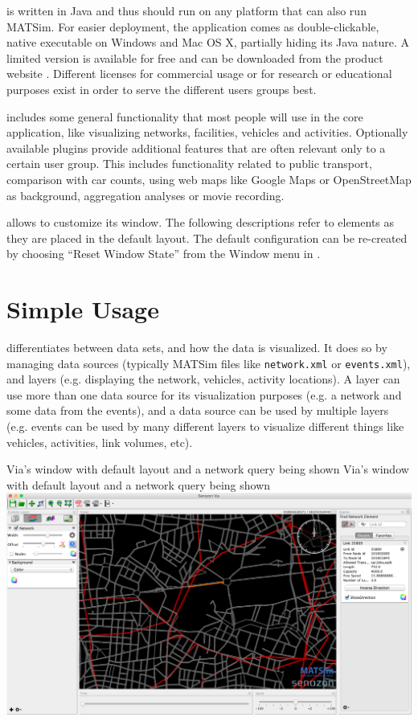 \Via{} is written in Java and thus should run on any platform that can also run
MATSim. For easier deployment, the application comes as double-clickable, native
executable on Windows and Mac OS X, partially hiding its Java nature. A
limited version is available for free and can be downloaded from the product
website \citep[][]{senozonVIA_Webpage_2014}. 
Different licenses for commercial usage or for research or educational purposes
exist in order to serve the different users groups best.

\Via{} includes some general functionality that most people will use in the core
application, like visualizing networks, facilities, vehicles and activities.
Optionally available plugins provide additional features that are
often relevant only to a certain user group. This includes functionality related
to public transport, comparison with car counts, using web maps like Google Maps
or OpenStreetMap as background, aggregation analyses or movie recording.

\Via{} allows to customize its window. The following descriptions refer to
elements as they are placed in the default layout. The default configuration can
be re-created by choosing ``Reset Window State'' from the Window menu in \Via{}.


\section{Simple Usage}

\Via{} differentiates between data sets, and how the data is visualized. It
does so by managing data sources (typically MATSim files like {\tt network.xml}
or {\tt events.xml}), and layers (e.g. displaying the network, vehicles,
activity locations). A layer can use more than one data source for its
visualization purposes (e.g. a network and some data from the events), and a
data source can be used by multiple layers (e.g. events can be used by many
different layers to visualize different things like vehicles, activities, link
volumes, etc).

\createfigure%
{Via's window with default layout and a network query being shown}%
{Via's window with default layout and a network query being shown}%
{\label{fig:via:window}}%
{\includegraphics[width=1.\textwidth,angle=0]{./extending/figures/via/window.png}}%
{}


